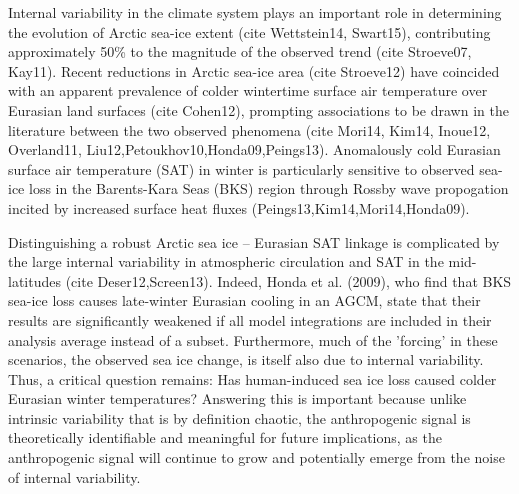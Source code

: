 \documentclass[grl]{AGUTeX}  %
\begin{document}
\begin{article}

%
%



Internal variability in the climate system plays an important role in determining the evolution of Arctic sea-ice extent (cite Wettstein14, Swart15), contributing approximately 50\% to the magnitude of the observed trend (cite Stroeve07, Kay11). Recent reductions in Arctic sea-ice area (cite Stroeve12) have coincided with an apparent prevalence of colder wintertime surface air temperature over Eurasian land surfaces (cite Cohen12), prompting associations to be drawn in the literature between the two observed phenomena (cite Mori14, Kim14, Inoue12, Overland11, Liu12,Petoukhov10,Honda09,Peings13). Anomalously cold Eurasian surface air temperature (SAT) in winter is particularly sensitive to observed sea-ice loss in the Barents-Kara Seas (BKS) region through Rossby wave propogation incited by increased surface heat fluxes (Peings13,Kim14,Mori14,Honda09). %

Distinguishing a robust Arctic sea ice -- Eurasian SAT linkage is complicated by the large internal variability in atmospheric circulation and SAT in the mid-latitudes (cite Deser12,Screen13). Indeed, Honda et al. (2009), who find that BKS sea-ice loss causes late-winter Eurasian cooling in an AGCM, state that their results are significantly weakened if all model integrations are included in their analysis average instead of a subset. Furthermore, much of the 'forcing' in these scenarios, the observed sea ice change, is itself also due to internal variability. Thus, a critical question remains: Has human-induced sea ice loss caused colder Eurasian winter temperatures? Answering this is important because unlike intrinsic variability that is by definition chaotic, the anthropogenic signal is theoretically identifiable and meaningful for future implications, as the anthropogenic signal will continue to grow and potentially emerge from the noise of internal variability.


\end{article}
\end{document}

